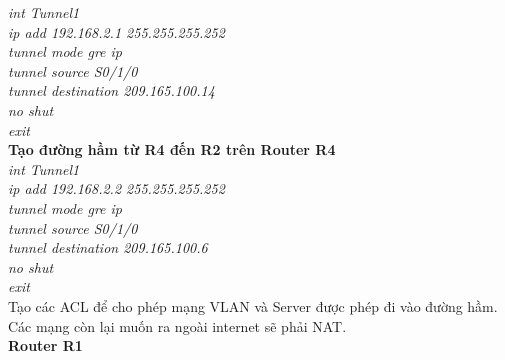 \documentclass[a4paper, 12pt]{article}
\begin{document}
\hspace*{2cm}\textit{int Tunnel1\\
\hspace*{2cm}ip add 192.168.2.1 255.255.255.252\\
\hspace*{2cm}tunnel mode gre ip\\
\hspace*{2cm}tunnel source S0/1/0\\
\hspace*{2cm}tunnel destination 209.165.100.14\\
\hspace*{2cm}no shut\\
\hspace*{2cm}exit\\} 
\hspace*{1cm}\textbf{Tạo đường hầm từ R4 đến R2 trên Router R4}\\
\hspace*{2cm} \textit{int Tunnel1\\
\hspace*{2cm}ip add 192.168.2.2 255.255.255.252\\
\hspace*{2cm}tunnel mode gre ip\\
\hspace*{2cm}tunnel source S0/1/0\\
\hspace*{2cm}tunnel destination 209.165.100.6\\
\hspace*{2cm}no shut\\
\hspace*{2cm}exit\\}
\hspace*{1cm}Tạo các ACL để cho phép mạng VLAN và Server được phép đi vào đường hầm. Các mạng còn lại muốn ra ngoài internet sẽ phải NAT.\\
\hspace*{1cm}\textbf{Router R1}	\\
\end{document}
